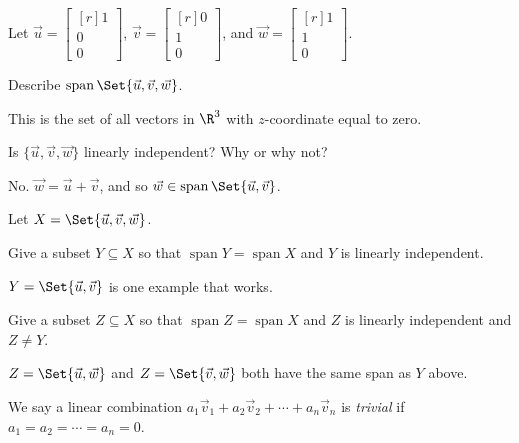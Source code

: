 \documentclass{problemset}
\DeclareMathOperator{\Span}{span}
\newcommand{\mat}[1]{\begin{bmatrix*}[r]#1\end{bmatrix*}}
\begin{document}
	\question
		Let $\vec u=\mat{1\\0\\0}$, $\vec v=\mat{0\\1\\0}$, and $\vec w=\mat{1\\1\\0}$.
	\begin{parts}
		\item Describe $\Span\Set{\vec u,\vec v,\vec w}$.
			\begin{solution}
				This is the set of all vectors in $\R^3$ with $z$-coordinate
				equal to zero.
			\end{solution}
		\item Is $\{\vec u,\vec v,\vec w\}$ linearly independent? Why or why not?
			\begin{solution}
				No. $\vec w=\vec u+\vec v$, and so $\vec w \in \Span\Set{\vec u, \vec v}$.
			\end{solution}
	\end{parts}

	Let $X=\Set{\vec u,\vec v,\vec w}$.

	\begin{parts}[resume]
		\item Give a subset $Y\subseteq X$ so that $\Span Y=\Span X$ and $Y$ is
			linearly independent.
			\begin{solution}
				$Y = \Set{\vec u,\vec v}$ is one example that works.
			\end{solution}
		\item Give a subset $Z\subseteq X$ so that $\Span Z=\Span X$ and $Z$ is
			linearly independent and $Z\neq Y$.
			\begin{solution}
				$Z = \Set{\vec u, \vec w}$ and $Z = \Set{\vec v, \vec w}$ both have 
				the same span as $Y$ above.
			\end{solution}
	\end{parts}


	\begin{definition}
	We say a linear combination 
	$a_1\vec v_1+a_2\vec v_2+\cdots +a_n\vec v_n$
	is \emph{trivial} if $a_1=a_2=\cdots=a_n=0$.
	\end{definition}
	
\end{document}
